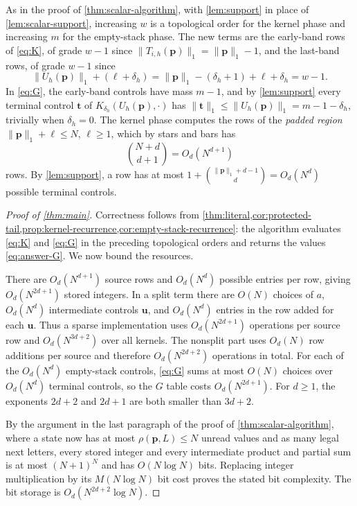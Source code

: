 \documentclass[11pt,reqno]{amsart}
\theoremstyle{definition}
\theoremstyle{remark}
\begin{document}
As in the proof of \cref{thm:scalar-algorithm}, with \cref{lem:support} in
place of \cref{lem:scalar-support}, increasing $w$ is a topological order
for the kernel phase and increasing $m$ for the empty-stack phase.  The new
terms are the early-band rows of \eqref{eq:K}, of grade $w-1$ since
$\|T_{i,h}(\mathbf p)\|_1=\|\mathbf p\|_1-1$, and the last-band rows, of
grade $w-1$ since
\[
 \|U_h(\mathbf p)\|_1+(\ell+\delta_h)
 =\|\mathbf p\|_1-(\delta_h+1)+\ell+\delta_h=w-1.
\]
In \eqref{eq:G}, the early-band controls have mass $m-1$, and by
\cref{lem:support} every terminal control $\mathbf t$ of
$K_{\delta_h}(U_h(\mathbf p),\mathord\cdot)$ has
$\|\mathbf t\|_1\leq\|U_h(\mathbf p)\|_1=m-1-\delta_h$, trivially when
$\delta_h=0$.
The kernel phase computes the rows of the \emph{padded region}
$\|\mathbf p\|_1+\ell\leq N$, $\ell\geq1$, which by stars and bars has
\begin{equation}\label{eq:row-count}
 \binom{N+d}{d+1}=O_d(N^{d+1})
\end{equation}
rows.  By \cref{lem:support}, a row has at most
$1+\binom{\|\mathbf p\|_1+d-1}{d}=O_d(N^d)$ possible terminal controls.

\begin{proof}[Proof of \cref{thm:main}]
Correctness follows from \cref{thm:literal,cor:protected-tail,prop:kernel-recurrence,cor:empty-stack-recurrence}:
the algorithm evaluates \eqref{eq:K} and \eqref{eq:G} in the preceding
topological orders and returns the values \eqref{eq:answer-G}.  We now bound the resources.

There are $O_d(N^{d+1})$ source rows and $O_d(N^d)$ possible entries per
row, giving $O_d(N^{2d+1})$ stored integers.  In a split term there
are $O(N)$ choices of $a$, $O_d(N^d)$ intermediate controls $\mathbf u$,
and $O_d(N^d)$ entries in the row added for each $\mathbf u$.  Thus a
sparse implementation uses $O_d(N^{2d+1})$ operations per source row and
$O_d(N^{3d+2})$ over all kernels.  The nonsplit part uses $O_d(N)$ row
additions per source and therefore $O_d(N^{2d+2})$ operations in total.  For
each of the $O_d(N^d)$ empty-stack controls,
\eqref{eq:G} sums at most $O(N)$ choices over $O_d(N^d)$ terminal controls,
so the $G$ table costs
$O_d(N^{2d+1})$.  For $d\geq1$, the exponents $2d+2$ and $2d+1$ are both
smaller than $3d+2$.

By the argument in the last paragraph of the proof of
\cref{thm:scalar-algorithm}, where a state now has at most
$\rho(\mathbf p,L)\leq N$ unread values and as many legal next letters, every
stored
integer and every intermediate product and partial sum is at most
$(N+1)^N$ and has $O(N\log N)$ bits.  Replacing integer multiplication by its
$M(N\log N)$ bit cost proves the stated bit complexity.  The bit storage is
$O_d(N^{2d+2}\log N)$.
\end{proof}
\end{document}
